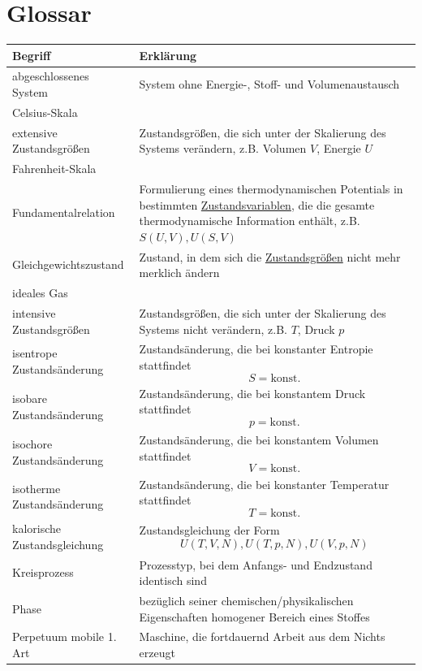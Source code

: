 \documentclass{article}
\begin{document}
\section{Glossar}
\begin{xltabular}{\linewidth}{p{6cm}|X}
	\hline\hline
		Begriff & Erklärung \\
	\hline
		abgeschlossenes System & System ohne Energie-, Stoff- und Volumenaustausch \\
	\hline
		Celsius-Skala &  \\
	\hline
		extensive Zustandsgrößen & Zustandsgrößen, die sich unter der Skalierung des Systems verändern, z.B. Volumen $V$, Energie $U$ \\
	\hline
		Fahrenheit-Skala &  \\
	\hline
		Fundamentalrelation & Formulierung eines thermodynamischen Potentials in bestimmten \underline{Zustandsvariablen}, die die gesamte thermodynamische Information enthält, z.B. $S(U,V), U(S,V)$ \\
	\hline
		Gleichgewichtszustand & Zustand, in dem sich die \underline{Zustandsgrößen} nicht mehr merklich ändern \\
	\hline
		ideales Gas &  \\
	\hline
		intensive Zustandsgrößen & Zustandsgrößen, die sich unter der Skalierung des Systems nicht verändern, z.B. $T$, Druck $p$ \\
	\hline
		isentrope Zustandsänderung & Zustandsänderung, die bei konstanter Entropie stattfindet
			$$S = \text{konst.}$$ \\	
	\hline
		isobare Zustandsänderung & Zustandsänderung, die bei konstantem Druck stattfindet
			$$p = \text{konst.}$$ \\	
	\hline
		isochore Zustandsänderung & Zustandsänderung, die bei konstantem Volumen stattfindet
			$$V = \text{konst.}$$ \\	
	\hline
		isotherme Zustandsänderung & Zustandsänderung, die bei konstanter Temperatur stattfindet
			$$T = \text{konst.}$$ \\			
	\hline
		kalorische Zustandsgleichung & Zustandsgleichung der Form
			$$U(T,V,N), U(T,p,N), U(V,p,N)$$ \\
	\hline
		Kreisprozess & Prozesstyp, bei dem Anfangs- und Endzustand identisch sind \\
	\hline
		Phase & bezüglich seiner chemischen/physikalischen Eigenschaften homogener Bereich eines Stoffes \\
	\hline
		Perpetuum mobile 1. Art & Maschine, die fortdauernd Arbeit aus dem Nichts erzeugt \\

\end{xltabular}
\end{document}
